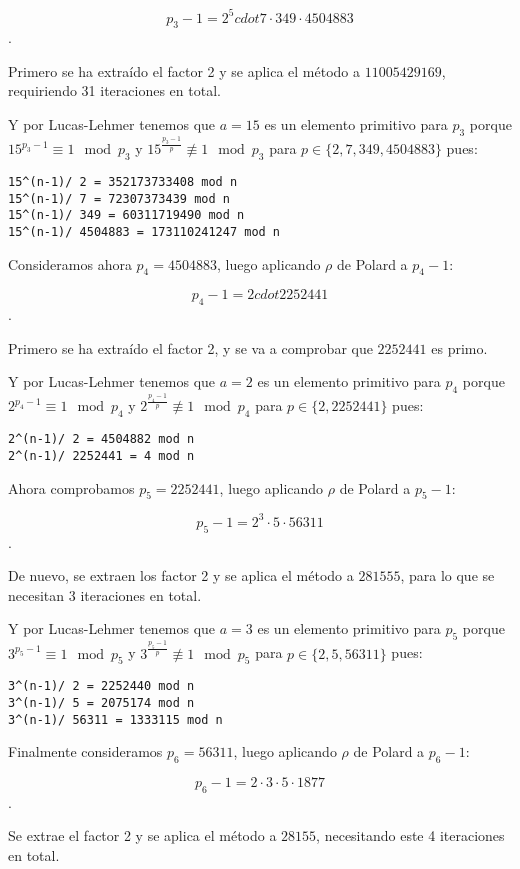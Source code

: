 \documentclass[a4paper]{article}
\begin{document}
$$p_3-1=2^5 cdot 7 \cdot 349\cdot 4504883$$.

Primero se ha extraído el factor 2 y se aplica el método a $11005429169$, requiriendo 31 iteraciones en total.

Y por Lucas-Lehmer tenemos que $a=15$ es un elemento primitivo para $p_3$ porque $15^{p_3-1}\equiv 1\mod p_3$ y $15^{\frac{p_3-1}{p}}\not\equiv 1\mod p_3 $ para $p\in\{2, 7, 349, 4504883\}$ pues:

\begin{verbatim}
15^(n-1)/ 2 = 352173733408 mod n
15^(n-1)/ 7 = 72307373439 mod n
15^(n-1)/ 349 = 60311719490 mod n
15^(n-1)/ 4504883 = 173110241247 mod n
\end{verbatim}

Consideramos ahora $p_4=4504883$, luego aplicando $\rho$ de Polard a $p_4-1$:

$$p_4-1=2 cdot 2252441$$.

Primero se ha extraído el factor 2, y se va a comprobar que $2252441$ es primo.

Y por Lucas-Lehmer tenemos que $a=2$ es un elemento primitivo para $p_4$ porque $2^{p_4-1}\equiv 1\mod p_4$ y $2^{\frac{p_4-1}{p}}\not\equiv 1\mod p_4 $ para $p\in\{2, 2252441\}$ pues:

\begin{verbatim}
2^(n-1)/ 2 = 4504882 mod n
2^(n-1)/ 2252441 = 4 mod n
\end{verbatim}

Ahora comprobamos $p_5=2252441$, luego aplicando $\rho$ de Polard a $p_5-1$:

$$p_5-1=2^3 \cdot 5\cdot 56311$$.

De nuevo, se extraen los factor 2 y se aplica el método a $281555$, para lo que se necesitan 3 iteraciones en total.

Y por Lucas-Lehmer tenemos que $a=3$ es un elemento primitivo para $p_5$ porque $3^{p_5-1}\equiv 1\mod p_5$ y $3^{\frac{p_5-1}{p}}\not\equiv 1\mod p_5 $ para $p\in\{2, 5, 56311\}$ pues:

\begin{verbatim}
3^(n-1)/ 2 = 2252440 mod n
3^(n-1)/ 5 = 2075174 mod n
3^(n-1)/ 56311 = 1333115 mod n
\end{verbatim}

Finalmente consideramos $p_6=56311$, luego aplicando $\rho$ de Polard a $p_6-1$:

$$p_6-1=2 \cdot 3\cdot 5\cdot 1877$$.

Se extrae el factor 2 y se aplica el método a $28155$, necesitando este 4 iteraciones en total.
\end{document}
